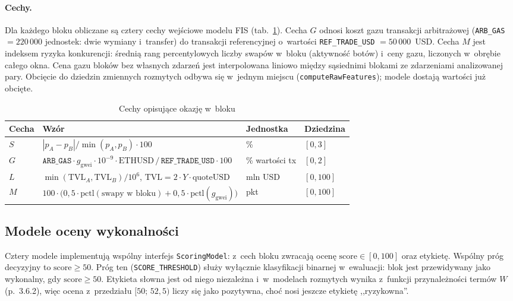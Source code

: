

\paragraph{Cechy.} Dla każdego bloku obliczane są cztery cechy wejściowe modelu FIS
(tab.~\ref{tab:features}). Cecha $G$ odnosi koszt gazu transakcji arbitrażowej
(\texttt{ARB\_GAS} $=220\,000$ jednostek: dwie wymiany i~transfer) do transakcji referencyjnej
o~wartości \texttt{REF\_TRADE\_USD} $=50\,000$~USD. Cecha $M$ jest indeksem ryzyka konkurencji:
średnią rang percentylowych liczby swapów w~bloku (aktywność botów) i~ceny gazu, liczonych
w~obrębie całego okna. Cena gazu bloków bez własnych zdarzeń jest interpolowana liniowo między
sąsiednimi blokami ze zdarzeniami analizowanej pary. Obcięcie do dziedzin zmiennych rozmytych
odbywa się w~jednym miejscu (\texttt{computeRawFeatures}); modele dostają wartości już obcięte.

\begin{table}[H]\centering\small
\caption{Cechy opisujące okazję w~bloku}\label{tab:features}
\begin{tabular}{llll}
\toprule
Cecha & Wzór & Jednostka & Dziedzina \\
\midrule
$S$ & $|p_A-p_B|/\min(p_A,p_B)\cdot 100$ & \% & $[0,3]$ \\
$G$ & $\texttt{ARB\_GAS}\cdot g_{\mathrm{gwei}}\cdot 10^{-9}\cdot \mathrm{ETHUSD}\,/\,\texttt{REF\_TRADE\_USD}\cdot 100$ & \% wartości tx & $[0,2]$ \\
$L$ & $\min(\mathrm{TVL}_A,\mathrm{TVL}_B)/10^{6}$, $\mathrm{TVL}=2\cdot Y\cdot \mathrm{quoteUSD}$ & mln USD & $[0,100]$ \\
$M$ & $100\cdot\big(0{,}5\cdot\mathrm{pctl}(\text{swapy w~bloku}) + 0{,}5\cdot\mathrm{pctl}(g_{\mathrm{gwei}})\big)$ & pkt & $[0,100]$ \\
\bottomrule
\end{tabular}
\end{table}

\subsection{Modele oceny wykonalności}

Cztery modele implementują wspólny interfejs \texttt{ScoringModel}: z~cech bloku zwracają ocenę
$\mathrm{score}\in[0,100]$ oraz etykietę. Wspólny próg decyzyjny to $\mathrm{score}\ge 50$.
Próg ten (\texttt{SCORE\_THRESHOLD}) służy wyłącznie klasyfikacji binarnej w~ewaluacji: blok jest
przewidywany jako wykonalny, gdy $\mathrm{score}\ge 50$. Etykieta słowna jest od niego niezależna
i~w~modelach rozmytych wynika z~funkcji przynależności termów $W$ (p.~3.6.2), więc ocena
z~przedziału $[50;\,52{,}5)$ liczy się jako pozytywna, choć nosi jeszcze etykietę ,,ryzykowna''.


